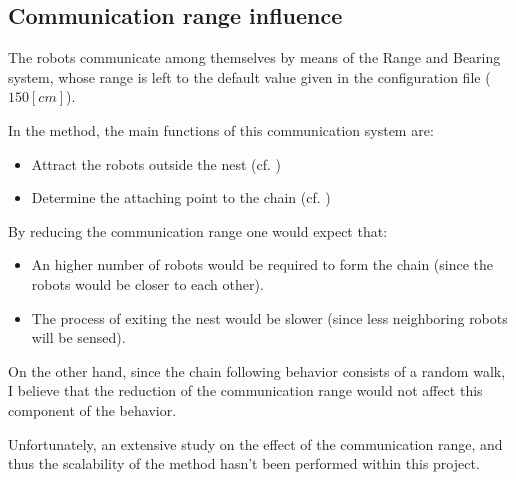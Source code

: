 \subsection{Communication range influence}\label{subsec:comrange}
The robots communicate among themselves by means of the Range and Bearing 
system, whose range is left to the default value given in the configuration file 
($150[cm]$).

In the method, the main functions of this communication system are:
\begin{itemize}
  \item Attract the robots outside the nest (cf. )
  \item Determine the attaching point to the chain (cf. )
\end{itemize}

By reducing the communication range one would expect that:
\begin{itemize}
  \item An higher number of robots would be required to form the 
chain (since the robots would be closer to each other).
\item The process of exiting the nest would be slower (since less neighboring robots will be sensed).
\end{itemize}
On the other hand, since the chain following behavior consists of a random walk, 
I believe that the reduction of the communication range would not affect this 
component of the behavior.

Unfortunately, an extensive study on the effect of the communication range, and thus the scalability of the method hasn't been performed within this project.
